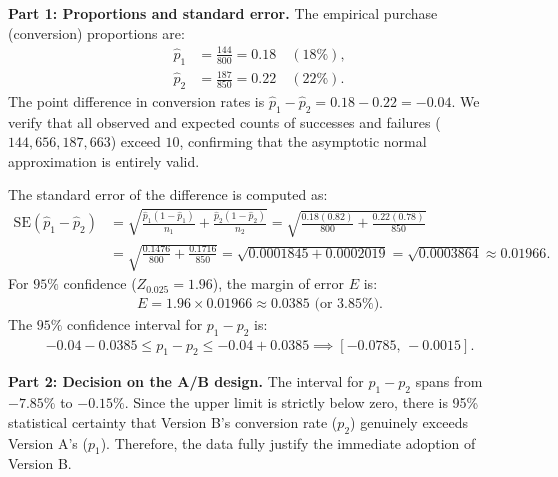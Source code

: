 \begin{solproblema}
	\textbf{Part 1: Proportions and standard error.}
	The empirical purchase (conversion) proportions are:
	\begin{align}
		\hat{p}_1 &= \frac{144}{800} = 0.18 \quad (18\%), \\
		\hat{p}_2 &= \frac{187}{850} = 0.22 \quad (22\%).
	\end{align}
	The point difference in conversion rates is $\hat{p}_1 - \hat{p}_2 = 0.18 - 0.22 = -0.04$. We verify that all observed and expected counts of successes and failures ($144, 656, 187, 663$) exceed $10$, confirming that the asymptotic normal approximation is entirely valid.
	
	The standard error of the difference is computed as:
	\begin{align}
		\text{SE}(\hat{p}_1 - \hat{p}_2) &= \sqrt{\frac{\hat{p}_1(1-\hat{p}_1)}{n_1} + \frac{\hat{p}_2(1-\hat{p}_2)}{n_2}} = \sqrt{\frac{0.18(0.82)}{800} + \frac{0.22(0.78)}{850}} \\
		&= \sqrt{\frac{0.1476}{800} + \frac{0.1716}{850}} = \sqrt{0.0001845 + 0.0002019} = \sqrt{0.0003864} \approx 0.01966.
	\end{align}
	For $95\%$ confidence ($Z_{0.025} = 1.96$), the margin of error $E$ is:
	\begin{align}
		E = 1.96 \times 0.01966 \approx 0.0385 \text{ (or 3.85\%).}
	\end{align}
	The $95\%$ confidence interval for $p_1 - p_2$ is:
	\begin{align}
		-0.04 - 0.0385 \le p_1 - p_2 \le -0.04 + 0.0385 \implies [-0.0785, \, -0.0015].
	\end{align}
	
	\textbf{Part 2: Decision on the A/B design.}
	The interval for $p_1 - p_2$ spans from $-7.85\%$ to $-0.15\%$. Since the upper limit is strictly below zero, there is 95\% statistical certainty that Version B's conversion rate ($p_2$) genuinely exceeds Version A's ($p_1$). Therefore, the data fully justify the immediate adoption of Version B.
\end{solproblema}

